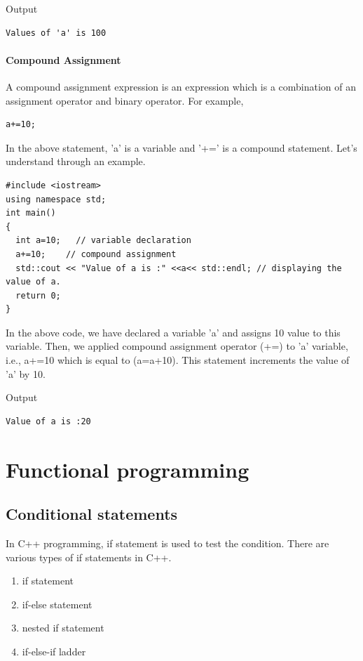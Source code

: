 \documentclass{book}
\begin{document}
Output

\begin{Verbatim}
Values of 'a' is 100  
\end{Verbatim}

\subsubsection{Compound Assignment}

A compound assignment expression is an expression which is a combination of an assignment operator and binary operator. 
For example,

\begin{Verbatim}
a+=10;   
\end{Verbatim}

In the above statement, 'a' is a variable and '+=' is a compound statement. Let's understand through an example.

\begin{lstlisting}
#include <iostream>  
using namespace std;  
int main()  
{  
  int a=10;   // variable declaration  
  a+=10;    // compound assignment  
  std::cout << "Value of a is :" <<a<< std::endl; // displaying the value of a.  
  return 0;  
}  
\end{lstlisting}

In the above code, we have declared a variable 'a' and assigns 10 value to this variable. Then, we applied compound assignment operator (+=) to 'a' variable, i.e., a+=10 which is equal to (a=a+10). This statement increments the value of 'a' by 10.

Output

\begin{Verbatim}
Value of a is :20 
\end{Verbatim} 

\chapter{Functional programming}

\section{Conditional statements}

In C++ programming, if statement is used to test the condition. There are various types of if statements in C++.

\begin{enumerate}
	\item if statement
\item if-else statement
\item nested if statement
\item if-else-if ladder
\end{enumerate}
\end{document}

